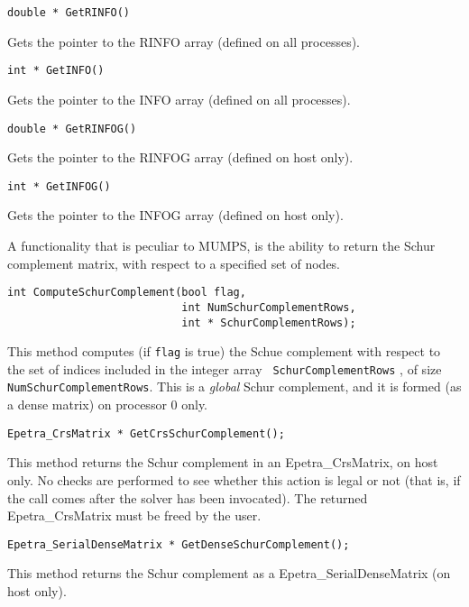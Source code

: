 \documentclass[11pt]{SANDreport}
\begin{document}
\medskip

\begin{verbatim}
double * GetRINFO() 
\end{verbatim}
Gets the pointer to the RINFO array (defined on all processes).

\medskip

\begin{verbatim}
int * GetINFO() 
\end{verbatim}
Gets the pointer to the INFO array (defined on all processes).

\medskip

\begin{verbatim}
double * GetRINFOG() 
\end{verbatim}
Gets the pointer to the RINFOG array (defined on host only).

\medskip

\begin{verbatim}
int * GetINFOG() 
\end{verbatim}
Gets the pointer to the INFOG array (defined on host only).

\bigskip
  
A functionality that is peculiar to MUMPS, is the ability to return
the Schur complement matrix, with respect to a specified set of nodes.

\begin{verbatim}
int ComputeSchurComplement(bool flag,
                           int NumSchurComplementRows, 
                           int * SchurComplementRows);
\end{verbatim}
This method computes (if \verb!flag! is true) the Schue complement with
respect to the set of indices included in the integer array {\tt
  SchurComplementRows} , of size {\tt NumSchurComplementRows}. This is a
{\sl global} Schur complement, and it is formed (as a dense matrix) on
processor 0 only.

\medskip

\begin{verbatim}
Epetra_CrsMatrix * GetCrsSchurComplement();
\end{verbatim}
This method returns the Schur complement in an Epetra\_CrsMatrix, on host
only. No checks are performed to see whether this action is legal or not
(that is, if the call comes after the solver has been invocated).
The returned Epetra\_CrsMatrix must be freed by the user.

\medskip

\begin{verbatim}
Epetra_SerialDenseMatrix * GetDenseSchurComplement();
\end{verbatim}
This method returns the Schur complement as a Epetra\_SerialDenseMatrix
(on host only).
\end{document}
